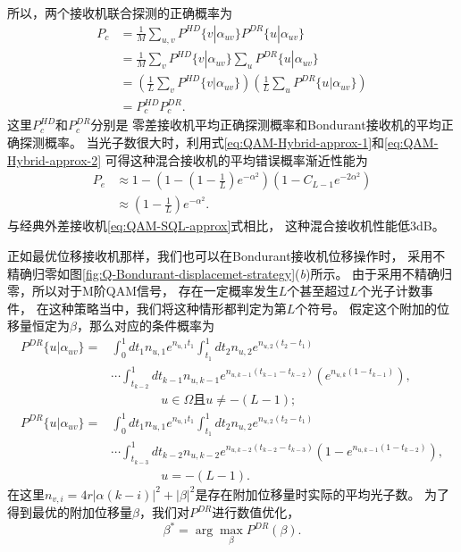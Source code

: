 所以，两个接收机联合探测的正确概率为
\begin{equation}
\begin{split}
P_c &= \frac{1}{M} \sum_{u,v} P^{HD}\{v| \alpha_{uv}\} P^{DR}\{u|\alpha_{uv}\} \\
    &= \frac{1}{M} \sum_v P^{HD}\{v| \alpha_{uv}\} \sum_u P^{DR}\{u|\alpha_{uv}\} \\
    &= \left( \frac{1}{L} \sum_v P^{HD}\{v| \alpha_{uv}\} \right) \left( \frac{1}{L} \sum_u P^{DR}\{u|\alpha_{uv}\} \right) \\
    &= P_c^{HD} P_c^{DR}.
\end{split}
\end{equation}
这里$P_c^{HD}$和$P_c^{DR}$分别是
零差接收机平均正确探测概率和Bondurant接收机的平均正确探测概率。
当光子数很大时，利用式\ref{eq:QAM-Hybrid-approx-1}和\ref{eq:QAM-Hybrid-approx-2}
可得这种混合接收机的平均错误概率渐近性能为
\begin{equation}
\begin{split}
P_e & \approx 1 - \left(1 - (1-\frac{1}{L}) e^{-\alpha^2} \right) \left( 1 - C_{L-1} e^{-2\alpha^2} \right)  \\
    & \approx (1-\frac{1}{L}) e^{-\alpha^2}.
\end{split}
\end{equation}
与经典外差接收机\ref{eq:QAM-SQL-approx}式相比，
这种混合接收机性能低3dB。




正如最优位移接收机那样，我们也可以在Bondurant接收机位移操作时，
采用不精确归零如图\ref{fig:Q-Bondurant-displacemet-strategy}(\textit{b})所示。
由于采用不精确归零，所以对于M阶QAM信号，
存在一定概率发生$L$个甚至超过$L$个光子计数事件，
在这种策略当中，我们将这种情形都判定为第$L$个符号。
假定这个附加的位移量恒定为$\beta$，那么对应的条件概率为
\begin{equation}
\begin{split}
P^{DR}\{u|\alpha_{uv}\} = & \int_0^1 dt_1 n_{u,1} e^{n_{u,1} t_1} \int_{t_1}^1 dt_2 n_{u,2} e^{n_{u,2} (t_2-t_1)} \\
                          & \cdots \int_{t_{k-2}}^1 dt_{k-1} n_{u,k-1} e^{n_{u,k-1} (t_{k-1}-t_{k-2})} \left( e^{n_{u,k} (1-t_{k-1})}\right), \\
                          & \qquad \qquad u \in \Omega \text{且} u \neq -(L-1);   \\
P^{DR}\{u|\alpha_{uv}\} = & \int_0^1 dt_1 n_{u,1} e^{n_{u,1} t_1} \int_{t_1}^1 dt_2 n_{u,2} e^{n_{u,2} (t_2-t_1)} \\
                          & \cdots \int_{t_{k-3}}^1 dt_{k-2} n_{u,k-2} e^{n_{u,k-2} (t_{k-2}-t_{k-3})} \left( 1 - e^{n_{u,k-1} (1-t_{k-2})}\right),  \\
                          & \qquad \qquad u = -(L-1).
\end{split}
\label{eq:DR-cond-p-2}
\end{equation}
在这里$n_{v,i} = 4r|\alpha(k-i)|^2 + |\beta|^2$是存在附加位移量时实际的平均光子数。
为了得到最优的附加位移量$\beta$，我们对$P^{DR}$进行数值优化，
\begin{equation}
\beta^* = \arg\max_{\beta} P^{DR}(\beta).
\end{equation}

